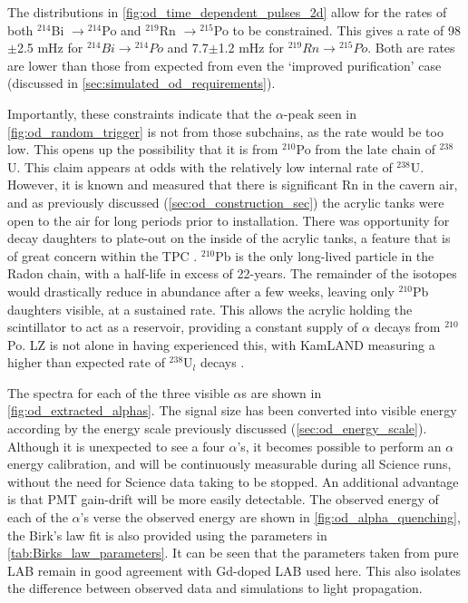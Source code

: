 \par
The distributions in \autoref{fig:od_time_dependent_pulses_2d} allow for the rates of both ${}^{214}$Bi $\to {}^{214}$Po and ${}^{219}$Rn $\to {}^{215}$Po to be constrained.
This gives a rate of 98$\pm$2.5 mHz for ${}^{214}Bi \to {}^{214}Po$ and 7.7$\pm$1.2 mHz for ${}^{219}Rn \to {}^{215}Po$.
Both are rates are lower than those from expected from even the `improved purification' case (discussed in \autoref{sec:simulated_od_requirements}).


\par
Importantly, these constraints indicate that the $\alpha$-peak seen in \autoref{fig:od_random_trigger} is not from those subchains, as the rate would be too low.
This opens up the possibility that it is from ${}^{210}$Po from the late chain of ${}^{238}$U. 
This claim appears at odds with the relatively low internal rate of ${}^{238}$U.
However, it is known and measured that there is significant Rn in the cavern air, and as previously discussed (\autoref{sec:od_construction_sec}) the acrylic tanks were open to the air for long periods prior to installation.
There was opportunity for decay daughters to plate-out on the inside of the acrylic tanks, a feature that is of great concern within the TPC \cite{radon_plateout_ref}.
${}^{210}$Pb is the only long-lived particle in the Radon chain, with a half-life in excess of 22-years. 
The remainder of the isotopes would drastically reduce in abundance after a few weeks, leaving only ${}^{210}$Pb daughters visible, at a sustained rate.
This allows the acrylic holding the scintillator to act as a reservoir, providing a constant supply of $\alpha$ decays from ${}^{210}$Po.
LZ is not alone in having experienced this, with KamLAND measuring a higher than expected rate of ${}^{238}$U$_l$ decays \cite{KamLAND_LS_contaminants_ref}.

\par
The spectra for each of the three visible $\alpha$s are shown in \autoref{fig:od_extracted_alphas}.
The signal size has been converted into visible energy according by the energy scale previously discussed (\autoref{sec:od_energy_scale}).
Although it is unexpected to see a four $\alpha$'s, it becomes possible to perform an $\alpha$ energy calibration, and will be continuously measurable during all Science runs, without the need for Science data taking to be stopped.
An additional advantage is that PMT gain-drift will be more easily detectable.
The observed energy of each of the $\alpha$'s verse the observed energy are shown in \autoref{fig:od_alpha_quenching}, the Birk's law fit is also provided using the parameters in \autoref{tab:Birks_law_parameters}.
It can be seen that the parameters taken from pure LAB remain in good agreement with Gd-doped LAB used here.
This also isolates the difference between observed data and simulations to light propagation.

